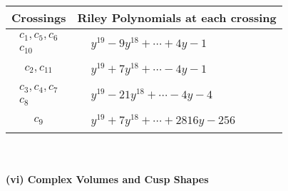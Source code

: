 \documentclass[1p]{elsarticle_modified}
\theoremstyle{definition}
\begin{document}
\begin{tabular}{m{50pt}|m{274pt}}
Crossings & \hspace{64pt}Riley Polynomials at each crossing \\
\hline $$\begin{aligned}c_{1},c_{5},c_{6}\\c_{10}\end{aligned}$$&$\begin{aligned}
&y^{19}-9 y^{18}+\cdots+4 y-1
\end{aligned}$\\
\hline $$\begin{aligned}c_{2},c_{11}\end{aligned}$$&$\begin{aligned}
&y^{19}+7 y^{18}+\cdots-4 y-1
\end{aligned}$\\
\hline $$\begin{aligned}c_{3},c_{4},c_{7}\\c_{8}\end{aligned}$$&$\begin{aligned}
&y^{19}-21 y^{18}+\cdots-4 y-4
\end{aligned}$\\
\hline $$\begin{aligned}c_{9}\end{aligned}$$&$\begin{aligned}
&y^{19}+7 y^{18}+\cdots+2816 y-256
\end{aligned}$\\
\hline
\end{tabular}\\~\\
\newpage\flushleft \textbf{(vi) Complex Volumes and Cusp Shapes}
\end{document}
